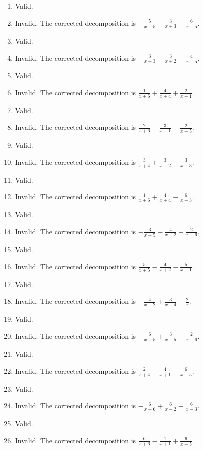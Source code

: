\documentclass[11pt,oneside]{book}
\begin{document}
\begin{enumerate}[leftmargin=*,label=\textbf{AB\arabic*.},itemsep=0.45\baselineskip]
\item Valid.
\item Invalid. The corrected decomposition is $\displaystyle - \frac{5}{x + 5} - \frac{3}{x + 3} + \frac{6}{x - 5}$.
\item Valid.
\item Invalid. The corrected decomposition is $\displaystyle - \frac{3}{x + 3} - \frac{3}{x + 2} + \frac{4}{x - 5}$.
\item Valid.
\item Invalid. The corrected decomposition is $\displaystyle \frac{1}{x + 6} + \frac{4}{x + 4} + \frac{2}{x - 1}$.
\item Valid.
\item Invalid. The corrected decomposition is $\displaystyle \frac{2}{x + 6} - \frac{3}{x - 1} - \frac{2}{x - 5}$.
\item Valid.
\item Invalid. The corrected decomposition is $\displaystyle \frac{3}{x + 4} + \frac{3}{x - 2} - \frac{3}{x - 3}$.
\item Valid.
\item Invalid. The corrected decomposition is $\displaystyle \frac{1}{x + 6} + \frac{4}{x + 4} - \frac{6}{x - 3}$.
\item Valid.
\item Invalid. The corrected decomposition is $\displaystyle - \frac{3}{x + 5} - \frac{4}{x - 2} + \frac{2}{x - 6}$.
\item Valid.
\item Invalid. The corrected decomposition is $\displaystyle \frac{5}{x + 5} - \frac{4}{x + 2} - \frac{5}{x - 1}$.
\item Valid.
\item Invalid. The corrected decomposition is $\displaystyle - \frac{4}{x + 2} + \frac{3}{x - 4} + \frac{2}{x}$.
\item Valid.
\item Invalid. The corrected decomposition is $\displaystyle - \frac{6}{x + 5} + \frac{3}{x - 5} - \frac{2}{x - 6}$.
\item Valid.
\item Invalid. The corrected decomposition is $\displaystyle \frac{2}{x + 4} - \frac{4}{x + 1} - \frac{6}{x - 5}$.
\item Valid.
\item Invalid. The corrected decomposition is $\displaystyle - \frac{6}{x + 6} + \frac{6}{x - 2} + \frac{6}{x - 3}$.
\item Valid.
\item Invalid. The corrected decomposition is $\displaystyle \frac{6}{x + 6} - \frac{1}{x + 1} + \frac{6}{x - 5}$.
\end{enumerate}
\end{document}
